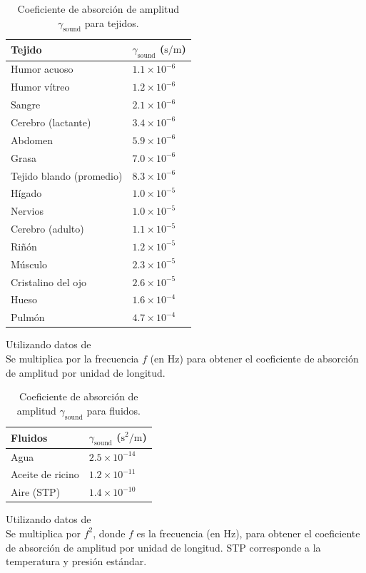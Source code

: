 \documentclass[12pt]{book}
\begin{document}

\begin{table}[h]
\centering
\caption{Coeficiente de absorción de amplitud $\gamma_{\text{sound}}$ para tejidos.}
\label{tab:103}
\small
\begin{tabularx}{0.6\textwidth}{X >{\centering\arraybackslash}X}
\toprule
Tejido & $\gamma_{\text{sound}}$ ($\text{s/m}$) \\
\midrule
Humor acuoso & $1.1 \times 10^{-6}$ \\
Humor vítreo & $1.2 \times 10^{-6}$ \\
Sangre & $2.1 \times 10^{-6}$ \\
Cerebro (lactante) & $3.4 \times 10^{-6}$ \\
Abdomen & $5.9 \times 10^{-6}$ \\
Grasa & $7.0 \times 10^{-6}$ \\
Tejido blando (promedio) & $8.3 \times 10^{-6}$ \\
Hígado & $1.0 \times 10^{-5}$ \\
Nervios & $1.0 \times 10^{-5}$ \\
Cerebro (adulto) & $1.1 \times 10^{-5}$ \\
Riñón & $1.2 \times 10^{-5}$ \\
Músculo & $2.3 \times 10^{-5}$ \\
Cristalino del ojo & $2.6 \times 10^{-5}$ \\
Hueso & $1.6 \times 10^{-4}$ \\
Pulmón & $4.7 \times 10^{-4}$ \\
\bottomrule
\end{tabularx}
\begin{flushleft}\small
Utilizando datos de~\cite{24}\\
Se multiplica por la frecuencia $f$ (en Hz) para obtener el coeficiente de absorción de amplitud por unidad de longitud.
\end{flushleft}
\end{table}
\FloatBarrier

\begin{table}[h]
\centering
\caption{Coeficiente de absorción de amplitud $\gamma_{\text{sound}}$ para fluidos.}
\label{tab:104}
\small
\begin{tabularx}{0.6\textwidth}{X >{\centering\arraybackslash}X}
\toprule
Fluidos & $\gamma_{\text{sound}}$ ($\text{s}^2\text{/m}$) \\
\midrule
Agua & $2.5 \times 10^{-14}$ \\
Aceite de ricino & $1.2 \times 10^{-11}$ \\
Aire (STP) & $1.4 \times 10^{-10}$ \\
\bottomrule
\end{tabularx}
\begin{flushleft}\small
Utilizando datos de~\cite{24}\\
Se multiplica por $f^2$, donde $f$ es la frecuencia (en Hz), para obtener el coeficiente de absorción de amplitud por unidad de longitud. STP corresponde a la temperatura y presión estándar.
\end{flushleft}
\end{table}
\FloatBarrier
\end{document}

